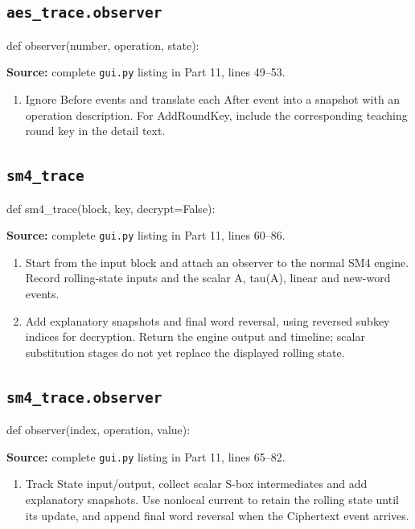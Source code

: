 \subsection{\texttt{aes\_\allowbreak{}trace.observer}}
\begin{lightcode}
def observer(number, operation, state):
\end{lightcode}
\noindent\textbf{Source:} complete \texttt{gui.py} listing in Part 11, lines 49--53.
\begin{enumerate}
\item Ignore Before events and translate each After event into a snapshot with an operation description. For AddRoundKey, include the corresponding teaching round key in the detail text.
\end{enumerate}
\subsection{\texttt{sm4\_\allowbreak{}trace}}
\begin{lightcode}
def sm4_trace(block, key, decrypt=False):
\end{lightcode}
\noindent\textbf{Source:} complete \texttt{gui.py} listing in Part 11, lines 60--86.
\begin{enumerate}
\item Start from the input block and attach an observer to the normal SM4 engine. Record rolling-state inputs and the scalar A, tau(A), linear and new-word events.
\item Add explanatory snapshots and final word reversal, using reversed subkey indices for decryption. Return the engine output and timeline; scalar substitution stages do not yet replace the displayed rolling state.
\end{enumerate}
\subsection{\texttt{sm4\_\allowbreak{}trace.observer}}
\begin{lightcode}
def observer(index, operation, value):
\end{lightcode}
\noindent\textbf{Source:} complete \texttt{gui.py} listing in Part 11, lines 65--82.
\begin{enumerate}
\item Track State input/output, collect scalar S-box intermediates and add explanatory snapshots. Use nonlocal current to retain the rolling state until its update, and append final word reversal when the Ciphertext event arrives.
\end{enumerate}
